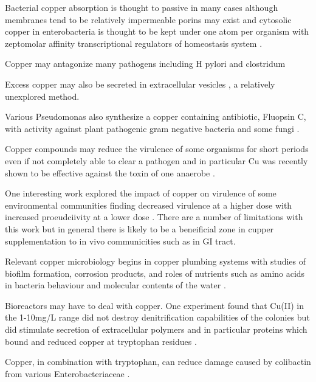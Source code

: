 {Bacterial copper absorption is thought to passive in many cases
although membranes tend to be relatively impermeable porins
may exist and cytosolic copper in enterobacteria is thought to
be kept under one atom per organism with zeptomolar affinity
transcriptional regulators of homeostasis system
\cite{Giachino_Waldron_Copper_tolerance_bacteria_2020}.


Copper may antagonize many pathogens including
H pylori
\cite{Bernegger_Brunner_VizoviUx0161badcharvv353ek_novel_FRET_peptide_2020}
and clostridum


Excess copper may also be secreted in extracellular vesicles
\cite{Lima_MatinhaCardoso_GinerLamia_Extracellular_vesicles_2022},
a relatively unexplored method.

Various Pseudomonas also synthesize a copper containing antibiotic,
Fluopsin C, with activity against plant pathogenic 
 gram negative bacteria and some fungi 
\cite{Afonso_deLimaAndreata_Chryssafidis_Fluopsin_Review_2022}.

Copper compounds may reduce the virulence of some  organisms for short periods
even if not completely able to clear a pathogen\cite{PMC4542191}
and in particular Cu was recently shown to be effective against
the toxin of one anaerobe  \cite{doi:10.1021/jacs.7b01084} .

One interesting work explored the impact of copper on virulence
of some environmental communities finding decreased virulence
at a higher dose with increased proeudciivity at a lower dose
\cite{Lear_Padfield_Hesse_Copper_reduces_virulence_2023}. 
There are a number of limitations with this work but in general
there is likely to be a beneificial zone in cupper supplementation
to in vivo communicities such as in GI tract. 


Relevant copper microbiology begins in copper plumbing
systems with studies of biofilm formation, corrosion products,
and roles of nutrients such as amino acids in bacteria
behaviour and molecular contents of the water
\cite{Hu_Wang_Shao_Enhanced_formation_carbonaceous_2020}.

Bioreactors may have to deal with copper. One experiment
found that Cu(II) in the 1-10mg/L range did not destroy
denitrification capabilities of the colonies but did
stimulate secretion of extracellular polymers and in particular
proteins which bound and reduced copper at tryptophan residues
\cite{PMID35288132}.

Copper, in combination with tryptophan, can reduce damage
caused by colibactin from various Enterobacteriaceae
\cite{JeffreyLawrenceBlanchard_tryptophan_copper_2024}.




} %

